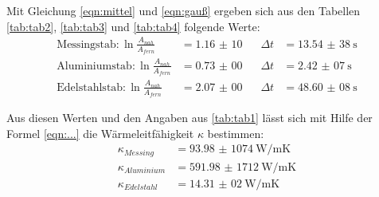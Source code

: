 



Mit Gleichung \ref{eqn:mittel} und \ref{eqn:gauß} ergeben sich aus den Tabellen
\ref{tab:tab2}, \ref{tab:tab3} und \ref{tab:tab4} folgende Werte:
\begin{align*}
  \text{Messingstab}: \ln{\frac{A_{nah}}{A_{fern}}} &=\SI{1,16(10)}\;\;\; &\Delta t &=\SI{13,54(38)}{\s}  \\
  \text{Aluminiumstab}: \ln{\frac{A_{nah}}{A_{fern}}} &=\SI{0,73(00)}\;\;\; &\Delta t &=\SI{2,42(07)}{\s}   \\
  \text{Edelstahlstab}: \ln{\frac{A_{nah}}{A_{fern}}} &=\SI{2,07(00)}\;\;\; &\Delta t &=\SI{48,60(08)}{\s}
\end{align*}

Aus diesen Werten und den Angaben aus \ref{tab:tab1} lässt sich mit Hilfe der Formel \ref{eqn:...}
die Wärmeleitfähigkeit $\kappa$ bestimmen:
\begin{align*}
  \kappa_{Messing} &=\SI{93,98(1074)}{\W\per\meter\kelvin} \\
  \kappa_{Aluminium} &=\SI{591,98(1712)}{\W\per\meter\kelvin} \\
  \kappa_{Edelstahl} &=\SI{14,31(02)}{\W\per\meter\kelvin}
\end{align*}

\label{sec:Auswertung}


